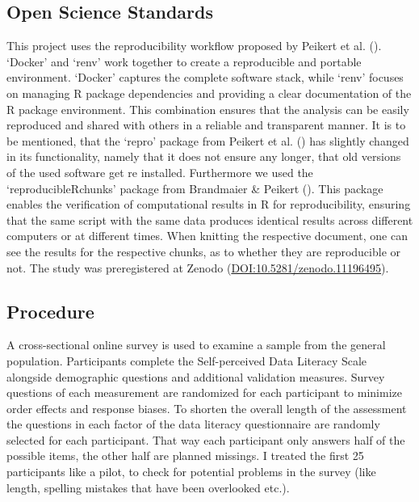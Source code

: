 \documentclass[
  12pt,
  a4paper,
  twoside]{article}
\begin{document}
\subsection{Open Science Standards}\label{open-science-standards}

This project uses the reproducibility workflow proposed by Peikert et al. (). `Docker' and `renv' work together to create a reproducible and portable environment. `Docker' captures the complete software stack, while `renv' focuses on
managing R package dependencies and providing a clear documentation of the R
package environment. This combination ensures that the analysis can be easily
reproduced and shared with others in a reliable and transparent manner. It is to be mentioned, that the `repro' package from Peikert et al. () has slightly changed in its functionality, namely that it does not ensure any longer, that old versions of the used software get re installed. Furthermore we used the `reproducibleRchunks' package from Brandmaier \& Peikert (). This package enables the verification of computational results in R for reproducibility, ensuring that the same script with the same data produces identical results across different computers or at different times. When knitting the respective document, one can see the results for the respective chunks, as to whether they are reproducible or not.
The study was preregistered at Zenodo (\url{DOI:10.5281/zenodo.11196495}).

\subsection{Procedure}\label{procedure}

A cross-sectional online survey is used to examine a sample from the general population. Participants complete the Self-perceived Data Literacy Scale alongside demographic questions and additional validation measures. Survey questions of each measurement are randomized for each participant to minimize order effects and response biases. To shorten the overall length of the assessment the questions in each factor of the data literacy questionnaire are randomly selected for each participant. That way each participant only answers half of the possible items, the other half are planned missings. I treated the first 25 participants like a pilot, to check for potential problems in the survey (like length, spelling mistakes that have been overlooked etc.).
\end{document}
